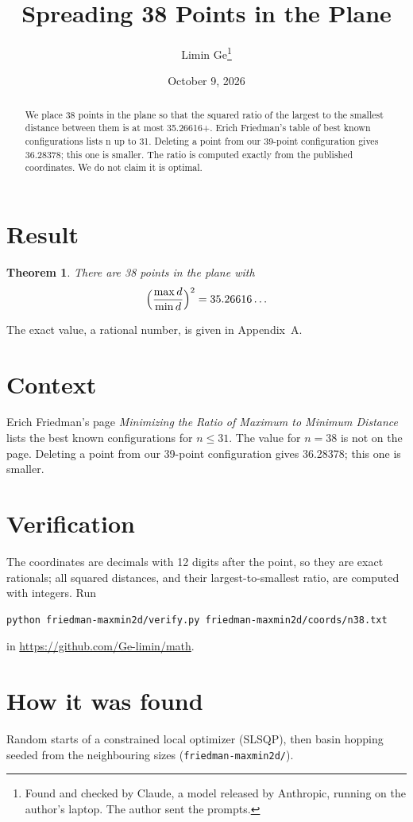 \documentclass[11pt,a4paper]{article}
\title{Spreading 38 Points in the Plane}
\author{Limin Ge\thanks{Found and checked by Claude, a model released by Anthropic, running on the author's laptop. The author sent the prompts.}}
\date{October 9, 2026}
\newtheorem*{theorem}{Theorem}
\begin{document}
\maketitle
\begin{abstract}
We place 38 points in the plane so that the squared ratio of the largest to the smallest distance between them is at most 35.26616+. Erich Friedman's table of best known configurations lists n up to 31. Deleting a point from our 39-point configuration gives 36.28378; this one is smaller. The ratio is computed exactly from the published coordinates. We do not claim it is optimal.
\end{abstract}

\section{Result}
\begin{theorem}
There are 38 points in the plane with
\[ \Bigl(\frac{\max d}{\min d}\Bigr)^2 = 35.26616\ldots \]
\end{theorem}
The exact value, a rational number, is given in Appendix~A.


\section{Context}
Erich Friedman's page \emph{Minimizing the Ratio of Maximum to Minimum Distance} lists the best known configurations for $n\le 31$. The value for $n=38$ is not on the page. Deleting a point from our 39-point configuration gives 36.28378; this one is smaller.


\section{Verification}
The coordinates are decimals with 12 digits after the point, so they are exact rationals; all squared distances, and their largest-to-smallest ratio, are computed with integers. Run
\begin{verbatim}
python friedman-maxmin2d/verify.py friedman-maxmin2d/coords/n38.txt
\end{verbatim}
in \url{https://github.com/Ge-limin/math}.


\section{How it was found}
Random starts of a constrained local optimizer (SLSQP), then basin hopping seeded from the neighbouring sizes (\texttt{friedman-maxmin2d/}).
\end{document}

